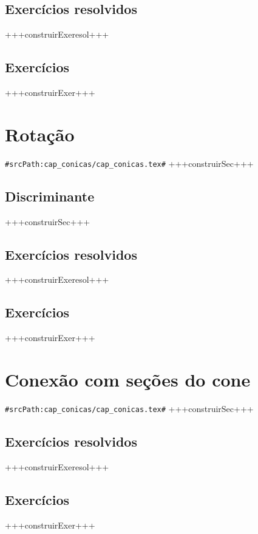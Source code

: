 \subsection*{Exercícios resolvidos}

+++construirExeresol+++


\subsection*{Exercícios}

+++construirExer+++

\section{Rotação}
\verb+#srcPath:cap_conicas/cap_conicas.tex#+
+++construirSec+++

\subsection{Discriminante}
+++construirSec+++

\subsection*{Exercícios resolvidos}
+++construirExeresol+++

\subsection*{Exercícios}
+++construirExer+++


\section{Conexão com seções do cone}
\verb+#srcPath:cap_conicas/cap_conicas.tex#+
+++construirSec+++

\subsection*{Exercícios resolvidos}
+++construirExeresol+++


\subsection*{Exercícios}
+++construirExer+++


